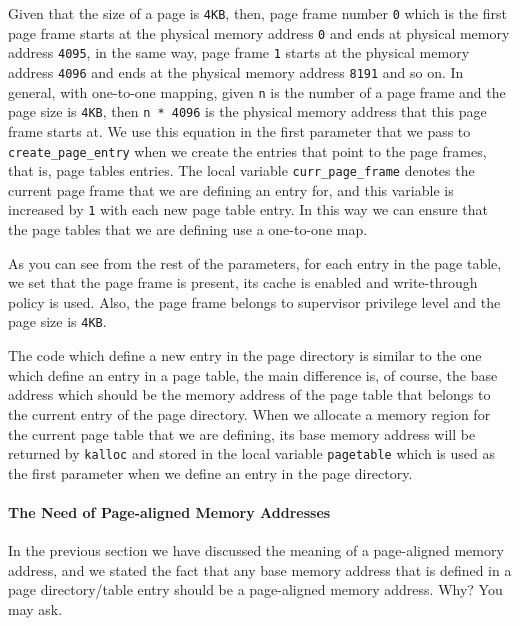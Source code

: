 Given that the size of a page is \lstinline!4KB!, then, page frame
number \lstinline!0! which is the first page frame starts at the
physical memory address \lstinline!0! and ends at physical memory
address \lstinline!4095!, in the same way, page frame \lstinline!1!
starts at the physical memory address \lstinline!4096! and ends at the
physical memory address \lstinline!8191! and so on. In general, with
one-to-one mapping, given \lstinline!n! is the number of a page frame
and the page size is \lstinline!4KB!, then \lstinline!n * 4096! is the
physical memory address that this page frame starts at. We use this
equation in the first parameter that we pass to
\lstinline!create_page_entry! when we create the entries that point to
the page frames, that is, page tables entries. The local variable
\lstinline!curr_page_frame! denotes the current page frame that we are
defining an entry for, and this variable is increased by \lstinline!1!
with each new page table entry. In this way we can ensure that the page
tables that we are defining use a one-to-one map.

As you can see from the rest of the parameters, for each entry in the
page table, we set that the page frame is present, its cache is enabled
and write-through policy is used. Also, the page frame belongs to
supervisor privilege level and the page size is \lstinline!4KB!.

The code which define a new entry in the page directory is similar to
the one which define an entry in a page table, the main difference is,
of course, the base address which should be the memory address of the
page table that belongs to the current entry of the page directory. When
we allocate a memory region for the current page table that we are
defining, its base memory address will be returned by \lstinline!kalloc!
and stored in the local variable \lstinline!pagetable! which is used as
the first parameter when we define an entry in the page directory.

\paragraph{The Need of Page-aligned Memory
Addresses}\label{the-need-of-page-aligned-memory-addresses}

In the previous section we have discussed the meaning of a page-aligned
memory address, and we stated the fact that any base memory address that
is defined in a page directory/table entry should be a page-aligned
memory address. Why? You may ask.

